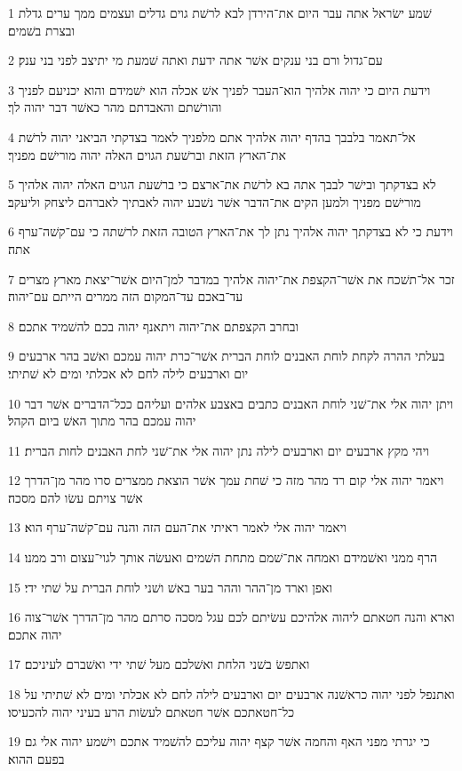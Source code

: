 \par 1 שׁמע ישׂראל אתה עבר היום את־הירדן לבא לרשׁת גוים גדלים ועצמים ממך ערים גדלת ובצרת בשׁמים׃
\par 2 עם־גדול ורם בני ענקים אשׁר אתה ידעת ואתה שׁמעת מי יתיצב לפני בני ענק׃
\par 3 וידעת היום כי יהוה אלהיך הוא־העבר לפניך אשׁ אכלה הוא ישׁמידם והוא יכניעם לפניך והורשׁתם והאבדתם מהר כאשׁר דבר יהוה לך׃
\par 4 אל־תאמר בלבבך בהדף יהוה אלהיך אתם מלפניך לאמר בצדקתי הביאני יהוה לרשׁת את־הארץ הזאת וברשׁעת הגוים האלה יהוה מורישׁם מפניך׃
\par 5 לא בצדקתך ובישׁר לבבך אתה בא לרשׁת את־ארצם כי ברשׁעת הגוים האלה יהוה אלהיך מורישׁם מפניך ולמען הקים את־הדבר אשׁר נשׁבע יהוה לאבתיך לאברהם ליצחק וליעקב׃
\par 6 וידעת כי לא בצדקתך יהוה אלהיך נתן לך את־הארץ הטובה הזאת לרשׁתה כי עם־קשׁה־ערף אתה׃
\par 7 זכר אל־תשׁכח את אשׁר־הקצפת את־יהוה אלהיך במדבר למן־היום אשׁר־יצאת מארץ מצרים עד־באכם עד־המקום הזה ממרים הייתם עם־יהוה׃
\par 8 ובחרב הקצפתם את־יהוה ויתאנף יהוה בכם להשׁמיד אתכם׃
\par 9 בעלתי ההרה לקחת לוחת האבנים לוחת הברית אשׁר־כרת יהוה עמכם ואשׁב בהר ארבעים יום וארבעים לילה לחם לא אכלתי ומים לא שׁתיתי׃
\par 10 ויתן יהוה אלי את־שׁני לוחת האבנים כתבים באצבע אלהים ועליהם ככל־הדברים אשׁר דבר יהוה עמכם בהר מתוך האשׁ ביום הקהל׃
\par 11 ויהי מקץ ארבעים יום וארבעים לילה נתן יהוה אלי את־שׁני לחת האבנים לחות הברית׃
\par 12 ויאמר יהוה אלי קום רד מהר מזה כי שׁחת עמך אשׁר הוצאת ממצרים סרו מהר מן־הדרך אשׁר צויתם עשׂו להם מסכה׃
\par 13 ויאמר יהוה אלי לאמר ראיתי את־העם הזה והנה עם־קשׁה־ערף הוא׃
\par 14 הרף ממני ואשׁמידם ואמחה את־שׁמם מתחת השׁמים ואעשׂה אותך לגוי־עצום ורב ממנו׃
\par 15 ואפן וארד מן־ההר וההר בער באשׁ ושׁני לוחת הברית על שׁתי ידי׃
\par 16 וארא והנה חטאתם ליהוה אלהיכם עשׂיתם לכם עגל מסכה סרתם מהר מן־הדרך אשׁר־צוה יהוה אתכם׃
\par 17 ואתפשׂ בשׁני הלחת ואשׁלכם מעל שׁתי ידי ואשׁברם לעיניכם׃
\par 18 ואתנפל לפני יהוה כראשׁנה ארבעים יום וארבעים לילה לחם לא אכלתי ומים לא שׁתיתי על כל־חטאתכם אשׁר חטאתם לעשׂות הרע בעיני יהוה להכעיסו׃
\par 19 כי יגרתי מפני האף והחמה אשׁר קצף יהוה עליכם להשׁמיד אתכם וישׁמע יהוה אלי גם בפעם ההוא׃
